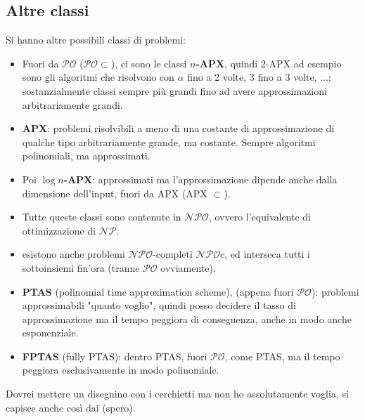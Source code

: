 \newpage

\subsection{Altre classi}
Si hanno altre possibili classi di problemi: 
\begin{itemize}
	\item Fuori da $\mathcal{PO}$ ($\mathcal{PO} \subset$), ci sono le classi \textbf{$n$-APX}, quindi $2$-APX ad esempio sono gli algoritmi che risolvono con $\alpha$ fino a 2 volte, 3 fino a 3 volte, ...; sostanzialmente classi sempre più grandi fino ad avere approssimazioni arbitrariamente grandi.\\
	
	\item \textbf{APX}: problemi risolvibili a meno di una costante di approssimazione di qualche tipo arbitrariamente grande, ma costante. Sempre algoritmi polinomiali, ma approssimati.\\
	
	\item Poi \textbf{$\log n$-APX}: approssimati ma l'approssimazione dipende anche dalla dimensione dell'input, fuori da APX (APX $\subset$).\\
	
	\item Tutte queste classi sono contenute in $\mathcal{NPO}$, ovvero l'equivalente di ottimizzazione di $\mathcal{NP}$.\\
	
	\item esistono anche problemi $\mathcal{NPO}$-completi $\mathcal{NPO}c$, ed interseca tutti i sottoinsiemi fin'ora (tranne $\mathcal{PO}$ ovviamente).\\
	
	\item \textbf{PTAS} (polinomial time approximation scheme), (appena fuori $\mathcal{PO}$): problemi approssimabili "quanto voglio", quindi posso decidere il tasso di approssimazione ma il tempo peggiora di conseguenza, anche in modo anche esponenziale.\\
	
	\item \textbf{FPTAS} (fully PTAS): dentro PTAS, fuori $\mathcal{PO}$, come PTAS, ma il tempo peggiora esclusivamente in modo polinomiale.\\
\end{itemize}

Dovrei mettere un disegnino con i cerchietti ma non ho assolutamente voglia, si capisce anche così dai (spero).\\

